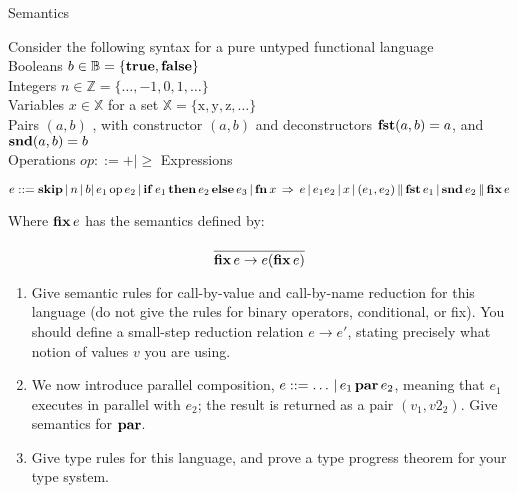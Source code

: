 \documentclass{tripos}  %
\begin{document}
\begin{question}[MockIB,year=2024,paper=1,question=8,author=rrw]{Semantics}


  Consider the following syntax for a pure untyped functional language\\

  Booleans $b \in \mathbb{B} = \{ \mbox{\textbf{true}}, \mbox{\textbf{false}} \}$ \\
  Integers $n \in \mathbb{Z} = \{ \dots{}, -1, 0, 1, \dots{} \}$\\
  Variables $x \in \mathbb{X}$ for a set $\mathbb{X} = \{ \mbox{x}, \mbox{y}, \mbox{z}, \dots{} \}$ \\
  Pairs $(a,b)$ , with constructor $(a,b)$ and deconstructors $\mbox{\textbf{fst}} (a,b) = a$, and $\mbox{\textbf{snd}} (a,b) = b$ \\
  Operations $ op ::= + | \ge$
  Expressions

  \[
  e ::= \mbox{\textbf{skip}}\, |\, n\, |\, b |\, e_1\, \mbox{op}\, e_2 \,|\, \mbox{\textbf{if}}\, e_1\, \mbox{\textbf{then}}\, e_2\, \mbox{\textbf{else}}\, e_3\, |\, \mbox{\textbf{fn}}\, x\, \Rightarrow\, e \,|\, e_1 e_2\, |\, x \,|\, (e_1,e_2) \,\|\, \mbox{\textbf{fst}}\, e_1 \,|\, \mbox{\textbf{snd}}\, e_2\, \| \,\mbox{\textbf{fix}}\, e
  \]

  Where $\mbox{\textbf{fix}}\, e$ has the semantics defined by:

  \[
  \frac{}{\mbox{\textbf{fix}}\, e \rightarrow e(\mbox{\textbf{fix}}\, e)}
  \]

  \begin{enumerate}
  \item Give semantic rules for call-by-value and call-by-name reduction for this language (do not give the rules for binary operators, conditional, or fix). You should define a small-step reduction relation $e \rightarrow e'$, stating precisely what notion of values $v$ you are using. 
  \item We now introduce parallel composition, $ e ::= \dots{}\, |\, e_1\, \mbox{\textbf{par}}\, e_2 $, meaning that $e_1$ executes in parallel with $e_2$; the result is returned as a pair $(v_1, v2_2)$. Give semantics for $\mbox{\textbf{par}}$.
  \item Give type rules for this language, and prove a type progress theorem for your type system. 
    \end{enumerate}

\end{question}
\end{document}
